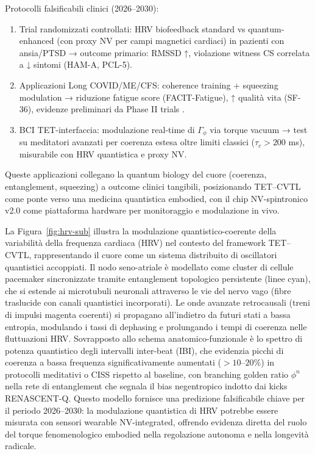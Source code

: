 \documentclass[11pt,a4paper]{article}
\let\oldcite\cite
\renewcommand{\cite}{\protect\oldcite}
\let\oldref\ref
\renewcommand{\ref}{\protect\oldref}
\theoremstyle{plain}
\theoremstyle{definition}
\begin{document}
Protocolli falsificabili clinici (2026–2030):
\begin{enumerate}
    \item Trial randomizzati controllati: HRV biofeedback standard vs quantum-enhanced (con proxy NV per campi magnetici cardiaci) in pazienti con ansia/PTSD → outcome primario: RMSSD ↑, violazione witness CS correlata a ↓ sintomi (HAM-A, PCL-5).
    \item Applicazioni Long COVID/ME/CFS: coherence training + squeezing modulation → riduzione fatigue score (FACIT-Fatigue), ↑ qualità vita (SF-36), evidenze preliminari da Phase II trials \cite{PhysiolRep2025}.
    \item BCI TET-interfaccia: modulazione real-time di $\Gamma_\phi$ via torque vacuum → test su meditatori avanzati per coerenza estesa oltre limiti classici ($\tau_c > 200$ ms), misurabile con HRV quantistica e proxy NV.
\end{enumerate}

Queste applicazioni collegano la quantum biology del cuore (coerenza, entanglement, squeezing) a outcome clinici tangibili, posizionando TET–CVTL come ponte verso una medicina quantistica embodied, con il chip NV-spintronico v2.0 come piattaforma hardware per monitoraggio e modulazione in vivo.


\vspace{0.6cm}


La Figura~\ref{fig:hrv-sub} illustra la modulazione quantistico-coerente della variabilità della frequenza cardiaca (HRV) nel contesto del framework TET–CVTL, rappresentando il cuore come un sistema distribuito di oscillatori quantistici accoppiati. Il nodo seno-atriale è modellato come cluster di cellule pacemaker sincronizzate tramite entanglement topologico persistente (linee cyan), che si estende ai microtubuli neuronali attraverso le vie del nervo vago (fibre traslucide con canali quantistici incorporati). Le onde avanzate retrocausali (treni di impulsi magenta coerenti) si propagano all’indietro da futuri stati a bassa entropia, modulando i tassi di dephasing e prolungando i tempi di coerenza nelle fluttuazioni HRV. Sovrapposto allo schema anatomico-funzionale è lo spettro di potenza quantistico degli intervalli inter-beat (IBI), che evidenzia picchi di coerenza a bassa frequenza significativamente aumentati ($>10$--$20\%$) in protocolli meditativi o CISS rispetto al baseline, con branching golden ratio $\phi^n$ nella rete di entanglement che segnala il bias negentropico indotto dai kicks RENASCENT-Q. Questo modello fornisce una predizione falsificabile chiave per il periodo 2026--2030: la modulazione quantistica di HRV potrebbe essere misurata con sensori wearable NV-integrated, offrendo evidenza diretta del ruolo del torque fenomenologico embodied nella regolazione autonoma e nella longevità radicale.
\end{document}
